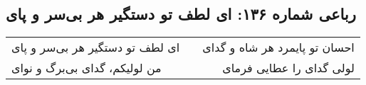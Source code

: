 \begin{center}
\section*{رباعی شماره ۱۳۶: ای لطف تو دستگیر هر بی‌سر و پای}
\label{sec:136}
\begin{longtable}{l p{0.5cm} r}
ای لطف تو دستگیر هر بی‌سر و پای
&&
احسان تو پایمرد هر شاه و گدای
\\
من لولیکم، گدای بی‌برگ و نوای
&&
لولی گدای را عطایی فرمای
\\
\end{longtable}
\end{center}
